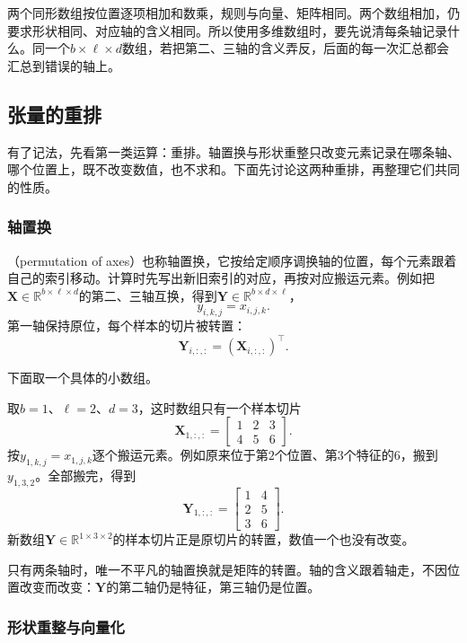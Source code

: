 两个同形数组按位置逐项相加和数乘，规则与向量、矩阵相同。两个数组相加，仍要求形状相同、对应轴的含义相同。所以使用多维数组时，要先说清每条轴记录什么。同一个$b\times\ell\times d$数组，若把第二、三轴的含义弄反，后面的每一次汇总都会汇总到错误的轴上。

\subsection{张量的重排}
\label{sec:ls-tensor-operations}

有了记法，先看第一类运算：重排。轴置换与形状重整只改变元素记录在哪条轴、哪个位置上，既不改变数值，也不求和。下面先讨论这两种重排，再整理它们共同的性质。

\subsubsection{轴置换}
\label{sec:ls-tensor-reshaping}
\label{sec:linear-algebra-tensors-structured-operations}

（permutation of axes）也称轴置换，它按给定顺序调换轴的位置，每个元素跟着自己的索引移动。计算时先写出新旧索引的对应，再按对应搬运元素。例如把$\bm X\in\mathbb R^{b\times\ell\times d}$的第二、三轴互换，得到$\bm Y\in\mathbb R^{b\times d\times\ell}$，
\[
 y_{i,k,j}=x_{i,j,k}.
\]
第一轴保持原位，每个样本的切片被转置：
\[
 \bm Y_{i,:,:}=(\bm X_{i,:,:})^\top.
\]

下面取一个具体的小数组。
\begin{example}[交换后两条轴]
\label{ex:ls-axis-swap}
取$b=1$、$\ell=2$、$d=3$，这时数组只有一个样本切片
\[
 \bm X_{1,:,:}=\begin{bmatrix}1&2&3\\4&5&6\end{bmatrix}.
\]
按$y_{1,k,j}=x_{1,j,k}$逐个搬运元素。例如原来位于第$2$个位置、第$3$个特征的$6$，搬到$y_{1,3,2}$。全部搬完，得到
\[
 \bm Y_{1,:,:}=\begin{bmatrix}1&4\\2&5\\3&6\end{bmatrix}.
\]
新数组$\bm Y\in\mathbb R^{1\times3\times2}$的样本切片正是原切片的转置，数值一个也没有改变。
\end{example}
只有两条轴时，唯一不平凡的轴置换就是矩阵的转置。轴的含义跟着轴走，不因位置改变而改变：$\bm Y$的第二轴仍是特征，第三轴仍是位置。

\subsubsection{形状重整与向量化}

